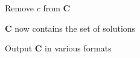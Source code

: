 \documentclass[10pt]{article}
\begin{document}
\begin{algorithm}[h]
\begin{algorithmic}[1]
            \EndFor        
            

                    \State Remove $c$ from $\mathbf{C}$
                \EndIf
            \EndFor

    \EndFor
    \Comment $\mathbf{C}$ now contains the set of solutions
    
    \State Output $\mathbf{C}$ in various formats
    

\EndProcedure
\end{algorithmic}
\end{algorithm}
\end{document}
